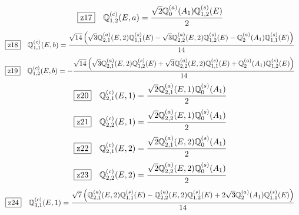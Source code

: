 \documentclass[fleqn,10pt,landscape]{jsarticle}
\begin{document}
\begin{dmath*}
\hspace*{3mm}\fbox{z17}\quad \mathbb{Q}_{1,2}^{(c)}(E,a)=\frac{\sqrt{2} \mathbb{Q}_{0}^{(a)}(A_{1}) \mathbb{Q}_{1,2}^{(s)}(E)}{2}
\end{dmath*}
\begin{dmath*}
\hspace*{3mm}\fbox{z18}\quad \mathbb{Q}_{1,1}^{(c)}(E,b)=\frac{\sqrt{14} \left(\sqrt{3} \mathbb{Q}_{2,1}^{(a)}(E,2) \mathbb{Q}_{1,1}^{(s)}(E) - \sqrt{3} \mathbb{Q}_{2,2}^{(a)}(E,2) \mathbb{Q}_{1,2}^{(s)}(E) - \mathbb{Q}_{2}^{(a)}(A_{1}) \mathbb{Q}_{1,1}^{(s)}(E)\right)}{14}
\end{dmath*}
\begin{dmath*}
\hspace*{3mm}\fbox{z19}\quad \mathbb{Q}_{1,2}^{(c)}(E,b)=- \frac{\sqrt{14} \left(\sqrt{3} \mathbb{Q}_{2,1}^{(a)}(E,2) \mathbb{Q}_{1,2}^{(s)}(E) + \sqrt{3} \mathbb{Q}_{2,2}^{(a)}(E,2) \mathbb{Q}_{1,1}^{(s)}(E) + \mathbb{Q}_{2}^{(a)}(A_{1}) \mathbb{Q}_{1,2}^{(s)}(E)\right)}{14}
\end{dmath*}
\begin{dmath*}
\hspace*{3mm}\fbox{z20}\quad \mathbb{Q}_{2,1}^{(c)}(E,1)=\frac{\sqrt{2} \mathbb{Q}_{2,1}^{(a)}(E,1) \mathbb{Q}_{0}^{(s)}(A_{1})}{2}
\end{dmath*}
\begin{dmath*}
\hspace*{3mm}\fbox{z21}\quad \mathbb{Q}_{2,2}^{(c)}(E,1)=\frac{\sqrt{2} \mathbb{Q}_{2,2}^{(a)}(E,1) \mathbb{Q}_{0}^{(s)}(A_{1})}{2}
\end{dmath*}
\begin{dmath*}
\hspace*{3mm}\fbox{z22}\quad \mathbb{Q}_{2,1}^{(c)}(E,2)=\frac{\sqrt{2} \mathbb{Q}_{2,1}^{(a)}(E,2) \mathbb{Q}_{0}^{(s)}(A_{1})}{2}
\end{dmath*}
\begin{dmath*}
\hspace*{3mm}\fbox{z23}\quad \mathbb{Q}_{2,2}^{(c)}(E,2)=\frac{\sqrt{2} \mathbb{Q}_{2,2}^{(a)}(E,2) \mathbb{Q}_{0}^{(s)}(A_{1})}{2}
\end{dmath*}
\begin{dmath*}
\hspace*{3mm}\fbox{z24}\quad \mathbb{Q}_{3,1}^{(c)}(E,1)=\frac{\sqrt{7} \left(\mathbb{Q}_{2,1}^{(a)}(E,2) \mathbb{Q}_{1,1}^{(s)}(E) - \mathbb{Q}_{2,2}^{(a)}(E,2) \mathbb{Q}_{1,2}^{(s)}(E) + 2 \sqrt{3} \mathbb{Q}_{2}^{(a)}(A_{1}) \mathbb{Q}_{1,1}^{(s)}(E)\right)}{14}
\end{dmath*}
\end{document}
